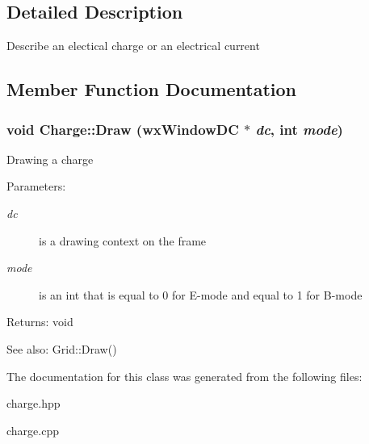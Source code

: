 \subsection{Detailed Description}
Describe an electical charge or an electrical current 



\subsection{Member Function Documentation}
\subsubsection{\setlength{\rightskip}{0pt plus 5cm}void Charge::Draw (wx\-Window\-DC $\ast$ {\em dc}, int {\em mode})}\label{classCharge_a3}


Drawing a charge \begin{Desc}
\item[Parameters:]
\begin{description}
\item[{\em dc}]is a drawing context on the frame \item[{\em mode}]is an int that is equal to 0 for E-mode and equal to 1 for B-mode \end{description}
\end{Desc}
\begin{Desc}
\item[Returns:]void \end{Desc}
\begin{Desc}
\item[See also:]Grid::Draw() \end{Desc}


The documentation for this class was generated from the following files:\begin{CompactItemize}
\item 
charge.hpp\item 
charge.cpp\end{CompactItemize}
